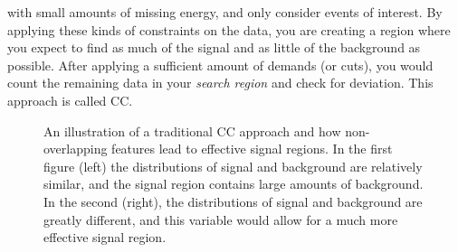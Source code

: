 with small amounts of missing energy, and only consider events of interest. By applying these kinds of 
constraints on the data, you are creating a region where you expect to find as much of the signal and as little 
of the background as possible. After applying a sufficient amount of demands (or cuts), you would count the 
remaining data in your \emph{search region} and check for deviation. This approach is called \acf{CC}.
\\
\begin{figure} 
    \centering
    \caption{An illustration of a traditional \acf{CC} approach and how non-overlapping features lead to effective
    signal regions. In the first figure (left) the distributions of signal and background are relatively similar, and 
    the signal region contains large amounts of background. In the second (right), the distributions of signal and 
    background are greatly different, and this variable would allow for a much more effective signal region. }
    \label{fig:overlap}
\end{figure}
